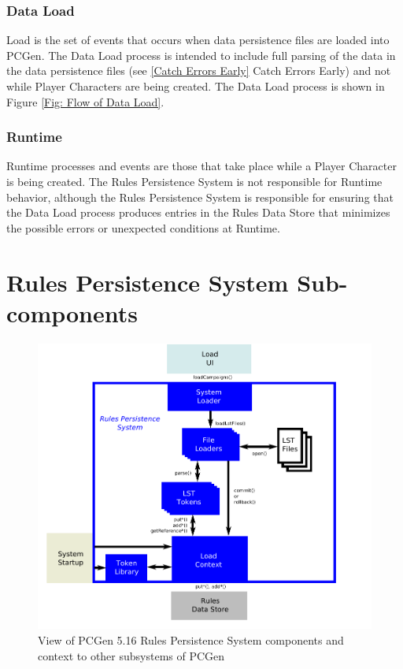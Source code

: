 \documentclass[12pt,letterpaper]{article}
\newcommand{\pcgenversEOS}{5.16}
\newcommand{\systemEOS}{Rules Persistence System}
\newcommand{\system}{\systemEOS{} }
\newcommand{\pcgenvers}{\pcgenversEOS{} }
\newcommand{\nsection}[1]{\newpage \section{#1}}
\newcommand{\lnsection}[1]{\label{#1}\nsection{#1}}
\newcommand{\lsubsubsection}[1]{\subsubsection{#1}\label{#1}}
\newcommand{\myref}[1]{\ref{#1} #1}
\newcommand{\openfig}{\begin{figure}[hbt]}
\newcommand{\closefig}[1]{\vspace*{-0.15in}\caption{#1}\end{figure}}
\begin{document}
\lsubsubsection{Data Load}

Load is the set of events that occurs when data persistence files are loaded into PCGen.
The Data Load process is intended to include full parsing of the data in the data 
persistence files (see \myref{Catch Errors Early}) and not while Player Characters are 
being created.  The Data Load process is shown in Figure \ref{Fig: Flow of Data Load}.

\lsubsubsection{Runtime}

Runtime processes and events are those that take place while a Player Character is 
being created.  The \system is not responsible for Runtime behavior, although the 
\system is responsible for ensuring that the Data Load process produces entries
in the Rules Data Store that minimizes the possible errors or unexpected conditions
at Runtime.

\lnsection{\system Sub-components}

\openfig\centerline{\includegraphics[width=6.5in]{rse.pdf}}\closefig{\label{Fig: Subcomponents and Relationships}View of PCGen \pcgenvers \system components and context to other subsystems of PCGen }
\end{document}
